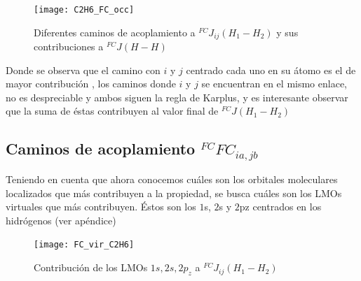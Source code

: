 \documentclass[
	12pt, %
]{fphw}
\begin{document}
  

\begin{figure}[h]
	\centering
	\texttt{[image: C2H6\_FC\_occ]}
	\caption{Diferentes caminos de acoplamiento a $^{FC}J_{ij}(H_1-H_2)$ y sus contribuciones a $^{FC}J(H-H)$}
\end{figure}	

Donde se observa que el camino con $i$ y $j$ centrado cada uno en su átomo es el de mayor contribución , los caminos
donde $i$ y $j$ se encuentran en el mismo enlace, no es despreciable y ambos siguen la regla de Karplus,
 y es interesante observar que la suma de éstas contribuyen al valor final de $^{FC}J(H_1-H_2)$


\subsection*{Caminos de acoplamiento $^{FC}FC_{ia,jb}$}

Teniendo en cuenta que ahora conocemos cuáles son los orbitales moleculares localizados que más contribuyen a la 
propiedad, se busca cuáles son los LMOs virtuales que más contribuyen. Éstos son los $1$s, $2$s y $2$pz centrados 
en los hidrógenos (ver apéndice)

\begin{figure}[h]
	\centering
	\texttt{[image: FC\_vir\_C2H6]}
	\caption{Contribución de los LMOs $1s,2s,2p_z$ a $^{FC}J_{ij}(H_1-H_2)$ }
\end{figure}



\printbibliography
\end{document}
